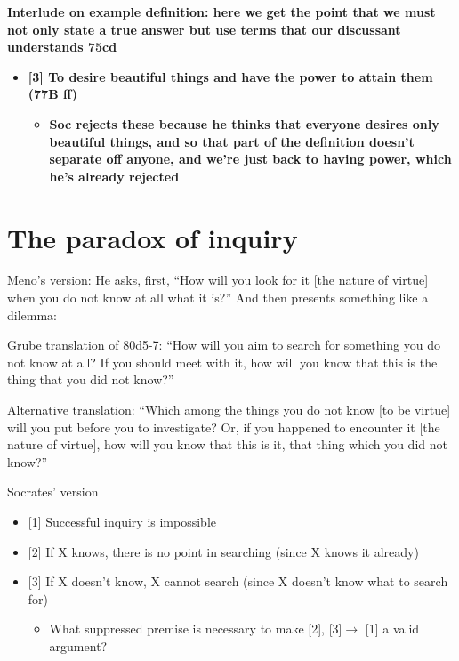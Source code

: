 \documentclass[11pt]{article}
\begin{document}
\noindent \textbf{Interlude on example definition: here we get the point that we must not only state a true answer but use terms that our discussant understands 75cd}

\begin{itemize}\item{\textbf{[3] To desire beautiful things and have the power to attain them (77B ff)}}\begin{itemize}\item{\textbf{Soc rejects these because he thinks that everyone desires only beautiful things, and so that part of the definition doesn't separate off anyone, and we're just back to having power, which he's already rejected}}\end{itemize}\end{itemize}


\section*{The paradox of inquiry}

\noindent Meno's version: He asks, first, ``How will you look for it [the nature of virtue] when you do not know at all what it is?'' And then presents something like a dilemma:
\vspace*{2mm}

\noindent Grube translation of 80d5-7: ``How will you aim to search for something you do not know at all? If you should meet with it, how will you know that this is the thing that you did not know?''
\vspace*{2mm}

\noindent Alternative translation: ``Which among the things you do not know [to be virtue] will you put before you to investigate? Or, if you happened to encounter it [the nature of virtue], how will you know that this is it, that thing which you did not know?''
\vspace*{2mm}

\noindent Socrates' version
\begin{itemize}\item{[1] Successful inquiry is impossible}\item{[2] If X knows, there is no point in searching (since X knows it already)}\item{[3] If X doesn't know, X cannot search (since X doesn't know what to search for)}\begin{itemize}\item{What suppressed premise is necessary to make [2], [3]$\rightarrow$ [1] a valid argument?}\end{itemize}\end{itemize}
\end{document}
